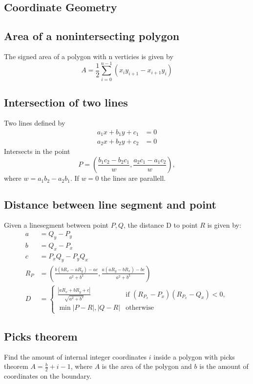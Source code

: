 \documentclass[8pt,a4paper,landscape,oneside]{amsart}
\begin{document}
\begin{multicols*}{2}
\begin{large}
\section{Coordinate Geometry}
    \subsection{Area of a nonintersecting polygon}
        The signed area of a polygon with n verticies is given by 
        $$A = \frac{1}{2}\sum_{i=0}^{n-1}(x_iy_{i+1} - x_{i+1}y_i)$$
    \subsection{Intersection of two lines}
        Two lines defined by 
        \begin{align*}
            a_1x + b_1y + c_1 &= 0 \\
            a_2x + b_2y + c_2 &= 0 
        \end{align*}
        Intersects in the point 
        $$P = (\frac{b_1c_2 - b_2c_1}{w}, \frac{a_2c_1 - a_1c_2}{w}),$$
        where $w = a_1b_2 - a_2b_1$. If $w = 0$ the lines are parallell.
        \subsection{Distance between line segment and point}
        Given a linesegment between point $P, Q$, the distance D to point $R$ is given by:
        \begin{align*}
            a &= Q_y - P_y \\
            b &= Q_x - P_x \\
            c &= P_xQ_y - P_yQ_x \\
            R_P &= (\frac{b(bR_x - aR_y) - ac}{a^2 + b^2}, \frac{a(aR_y - bR_x) - bc}{a^2 + b^2}) \\
            D &= 
            \begin{cases}
                \frac{|aR_x + bR_y + c|}{\sqrt{a^2 + b^2}} & \text{if $(R_{P_x}- P_x)(R_{P_x} - Q_x) < 0$}, \\
                \min{|P - R|, |Q - R|} & \text{otherwise}
            \end{cases}
        \end{align*}
    \subsection{Picks theorem}
        Find the amount of internal integer coordinates $i$ inside a polygon with picks theorem
        $A = \frac{b}{2} + i - 1$, where $A$ is the area of the polygon and 
        $b$ is the amount of coordinates on the boundary.


\end{large}
\end{multicols*}
\end{document}
